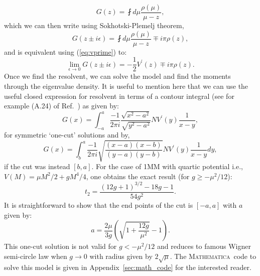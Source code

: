\documentclass[letter,11pt]{article}
\newcommand{\MA}{\textsc{Mathematica}}
\begin{document}
\begin{equation}
	G(z) = \fint d\mu \frac{\rho(\mu)}{\mu - z},
\end{equation}
which we can then write using Sokhotski-Plemelj theorem,
\begin{equation}
	G(z \pm i \epsilon) = \fint d\mu \frac{\rho(\mu)}{\mu - z} \mp i\pi \rho(z),  
\end{equation}
and is equivalent using (\ref{eq:vprime}) to: 
\begin{equation}
	\lim_{\epsilon \to 0} G(z \pm i \epsilon) = -\frac{1}{2} V^{\prime}(z) \mp i\pi \rho(z).  
\end{equation}
Once we find the resolvent, we can solve the model and find the moments through the eigenvalue density. 
It is useful to mention here that we can use the useful closed expression for 
resolvent in terms of a contour integral (see for example (A.24) of Ref.~\cite{Migdal:1983qrz})
as given by:
\begin{equation}
	G(x) = \int_{-a}^{a} \frac{-1}{2\pi i} \frac{\sqrt{x^2-a^2}}{\sqrt{y^2-a^2}} N V^{\prime}(y) \frac{1}{x-y}, 
\end{equation}
for symmetric `one-cut' solutions and by,
\begin{equation}
	G(x) = \int_{b}^{a} \frac{-1}{2\pi i} \sqrt{\frac{(x-a) (x-b)}{(y-a)(y-b)}}  N V^{\prime}(y) \frac{1}{x-y} dy, 
\end{equation}
if the cut was instead $[b,a]$. For the case of 1MM with quartic potential i.e., 
$V(M) = \mu M^2/2 + gM^4/4$, one obtains the exact result (for $g \ge -\mu^2/12$):
\begin{equation}
\label{eq:exact1MM} 
t_{2} = \frac{(12 g+1)^{3/2}-18 g-1}{54 g^2}. 
\end{equation}
It is straightforward to show that the end points of the cut is $[-a,a]$ with $a$ given by:
\begin{equation}
a = \frac{2\mu}{3g} \left( \sqrt{1 + \frac{12g}{\mu^2}} - 1\right). 
\end{equation}
This one-cut solution is not valid for $g < -\mu^2/12$ and reduces to famous Wigner semi-circle
law when $g \to 0$ with radius given by $2 \sqrt{\mu}$. The \MA~code to solve 
this model is given in Appendix~\ref{sec:math_code} for the interested reader. 
\end{document}

